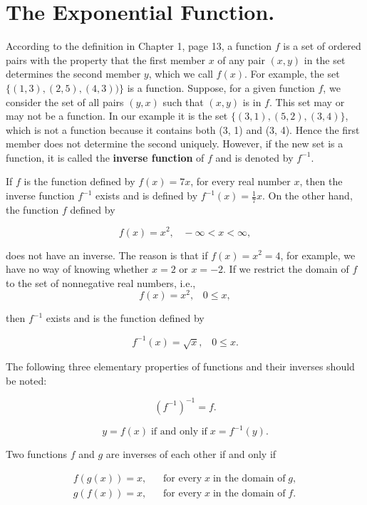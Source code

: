 \section{The Exponential Function.}\label{sec 5.2} 
According to the definition in Chapter 1, page 13, a function $f$ is a set of ordered pairs with the property that the first member $x$ of any pair $(x, y)$ in the set determines the second member $y$, which we call $f(x)$. For example, the set $\{(1, 3), (2, 5), (4, 3))\}$ is a function. Suppose, for a given function $f$, we consider the set of all pairs $(y, x)$ such that $(x, y)$ is in $f$. This set may or may not be a function. In our example it is the set $\{(3, 1), (5, 2), (3, 4)\}$, which is not a function because it contains both (3, 1) and (3, 4). Hence the first member does not determine the second uniquely. However, if the new set is a function, it is called the \textbf{inverse function} of $f$ and is denoted by $f^{-1}$.

If $f$ is the function defined by $f(x) = 7x$, for every real number $x$, then the inverse function $f^{-1}$ exists and is defined by $f^{-1}(x) = \frac{1}{7}x$. On the other hand, the function $f$ defined by

$$
f(x) = x^2, \;\;\; -\infty < x < \infty,
$$

\noindent does not have an inverse. The reason is that if $f(x) = x^2 = 4$, for example, we have no way of knowing whether $x = 2$ or $x = - 2$. If we restrict the domain of $f$ to the set of nonnegative real numbers, i.e.,
$$
f(x) = x^2, \;\;\; 0 \leq x, 
$$

\noindent then $f^{-1}$ exists and is the function defined by

$$
f^{-1}(x) = \sqrt x, \;\;\; 0 \leq x.
$$

The following three elementary properties of functions and their inverses
should be noted: 

\begin{theorem} %
$$
(f^{-1})^{-1} = f. 
$$
\end{theorem}

 
\begin{theorem} %
$$
y = f (x) \;\mbox{if and only if}\; x = f^{-1}(y).
$$
\end{theorem}

\begin{theorem} %
Two functions $f$ and $g$ are inverses of each other if and only if 

$$
\begin{array}{ll}
f(g(x)) = x, &\;\;\; \mbox{for every}\; x \;\mbox{in the domain of}\; g,\\
g(f(x)) = x, &\;\;\; \mbox{for every}\; x \;\mbox{in the domain of}\; f. 
\end{array}
$$
\end{theorem}

